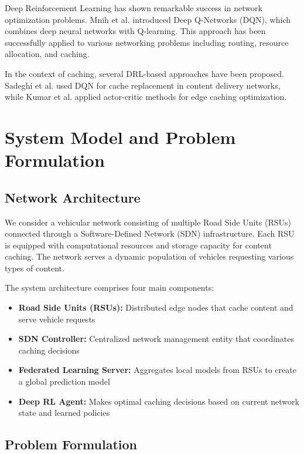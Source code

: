 \documentclass[conference]{IEEEtran}
\begin{document}
Deep Reinforcement Learning has shown remarkable success in network optimization problems. Mnih et al. \cite{mnih2015} introduced Deep Q-Networks (DQN), which combines deep neural networks with Q-learning. This approach has been successfully applied to various networking problems including routing, resource allocation, and caching.

In the context of caching, several DRL-based approaches have been proposed. Sadeghi et al. \cite{sadeghi2019} used DQN for cache replacement in content delivery networks, while Kumar et al. \cite{kumar2020} applied actor-critic methods for edge caching optimization.

\section{System Model and Problem Formulation}

\subsection{Network Architecture}

We consider a vehicular network consisting of multiple Road Side Units (RSUs) connected through a Software-Defined Network (SDN) infrastructure. Each RSU is equipped with computational resources and storage capacity for content caching. The network serves a dynamic population of vehicles requesting various types of content.

The system architecture comprises four main components:

\begin{itemize}
\item \textbf{Road Side Units (RSUs):} Distributed edge nodes that cache content and serve vehicle requests
\item \textbf{SDN Controller:} Centralized network management entity that coordinates caching decisions
\item \textbf{Federated Learning Server:} Aggregates local models from RSUs to create a global prediction model
\item \textbf{Deep RL Agent:} Makes optimal caching decisions based on current network state and learned policies
\end{itemize}

\subsection{Problem Formulation}
\end{document}
